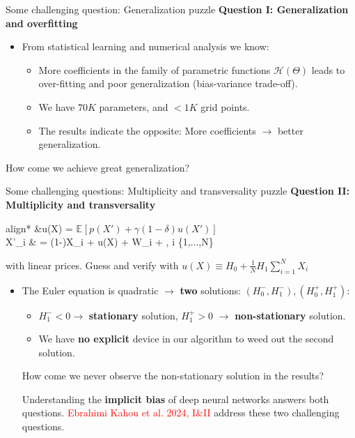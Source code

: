 \documentclass[aspectratio=169,10pt]{beamer}
\newcommand{\emphcolor}[1]{\textbf{\textcolor{emphcolorval}{#1}}}
\newcommand{\expec}[2][]{\ensuremath{\mathbb{E}_{{#1}}\left[ {#2} \right]}}
\begin{document}
\begin{frame}{Some challenging question: Generalization puzzle}
	\emphcolor{Question I: Generalization and overfitting}
	\begin{itemize}
		\item From statistical learning and numerical analysis we know:\vspace{0.1in}
		\begin{itemize}
			\item More coefficients in the family of parametric functions $\mathcal{H}(\Theta)$ leads to over-fitting and poor generalization (bias-variance trade-off).\vspace{0.1in}
		  \item We have $70K$ parameters, and $<1K$ grid points.\vspace{0.1in}
			\item The results indicate the opposite: More coefficients $\rightarrow$ better generalization.  \vspace{0.1in}
		\end{itemize}
	\end{itemize}
How come we achieve great generalization?  
\end{frame}

\begin{frame}{Some challenging questions: Multiplicity and transversality puzzle}
\emphcolor{Question II: Multiplicity and transversality} 
	\begin{empheq}[box=\tcbhighmath]{align*}
		&\gamma u(X) = \beta \expec{p(X')+\gamma (1-\delta) u(X') }\\
		  X'_i & = (1-\delta)X_i + u(X) + \sigma W_i + \eta \omega,\quad{} i \in \{1,...,N\}
	\end{empheq}
with linear prices. Guess and verify with $u(X) \equiv H_0 + \frac{1}{N} H_1 \sum_{i=1}^N X_i$  
\begin{itemize}
		\item The Euler equation is quadratic $\rightarrow$ \emphcolor{two} solutions: $(H_0^-, H_1^-), (H_0^+, H_1^+)$:\vspace{0.1in}
	\begin{itemize}
		\item $H_1^- <0 \rightarrow$  \emphcolor{stationary} solution, $H_1^+ > 0$ $\rightarrow$ \emphcolor{non-stationary} solution. \vspace{0.1in}
		\item We have \emphcolor{no explicit} device in our algorithm to weed out the second solution. \vspace{0.1in}
	\end{itemize}
	How come we never observe the non-stationary solution in the results? 
	\vspace{0.1in}
	
	Understanding the \emphcolor{implicit bias} of deep neural networks answers both questions.  \textcolor{red}{Ebrahimi Kahou et al. 2024, I\&II} address these two challenging questions. 
\end{itemize}
\end{frame}	
				
\end{document}
